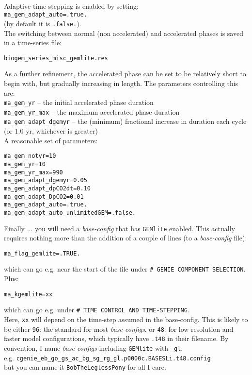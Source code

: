 \documentclass[10pt,twoside]{article}
\begin{document}
\begin{compactenum}
\\Adaptive time-stepping is enabled by setting:
\\\texttt{ma\_gem\_adapt\_auto=.true.}
\\(by default it is \texttt{.false.}).
\\The switching between normal (non accelerated) and accelerated phases is saved in a time-series file:
\vspace{-5pt}\begin{verbatim}biogem_series_misc_gemlite.res\end{verbatim}\vspace{-5pt}

As a further refinement, the accelerated phase can be set to be relatively short to begin with, but gradually increasing in length. The parameters controlling this are:
\\\texttt{ma\_gem\_yr} -- the initial accelerated phase duration
\\\texttt{ma\_gem\_yr\_max} -- the maximum accelerated phase duration
\\\texttt{ma\_gem\_adapt\_dgemyr} -- the (minimum) fractional increase in duration each cycle (or 1.0 yr, whichever is greater)
\\ A reasonable set of parameters:
\vspace{-5pt}\begin{verbatim}
ma_gem_notyr=10
ma_gem_yr=10
ma_gem_yr_max=990
ma_gem_adapt_dgemyr=0.05
ma_gem_adapt_dpCO2dt=0.10
ma_gem_adapt_DpCO2=0.01
ma_gem_adapt_auto=.true.
ma_gem_adapt_auto_unlimitedGEM=.false.
\end{verbatim}\vspace{-5pt}
	
\end{compactenum}

Finally ... you will need a \textit{base-config} that has \texttt{GEMlite} enabled.
This actually requires nothing more than the addition of a couple of lines (to a \textit{base-config} file): 
\vspace{-10pt}\begin{verbatim}
ma_flag_gemlite=.TRUE.
\end{verbatim}\vspace{-10pt}
which can go e.g. near the start of the file under \texttt{\# GENIE COMPONENT SELECTION}.
Plus:
\vspace{-10pt}\begin{verbatim}
ma_kgemlite=xx
\end{verbatim}\vspace{-10pt}
which can go e.g. under \texttt{\# TIME CONTROL AND TIME-STEPPING}.
\\Here, \texttt{xx} will depend on the time-step assumed in the base-config. This is likely to be either \texttt{96}: the standard for most \textit{base-configs}, or \texttt{48}: for low resolution and faster model configurations, which typically have \texttt{.t48} in their filename.
By convention, I name \textit{base-configs} including \texttt{GEMlite} with \texttt{\_gl},
\\e.g. \texttt{cgenie\_eb\_go\_gs\_ac\_bg\_sg\_rg\_gl.p0000c.BASESLi.t48.config}
\\but you can name it \texttt{BobTheLeglessPony} for all I care.
\end{document}
